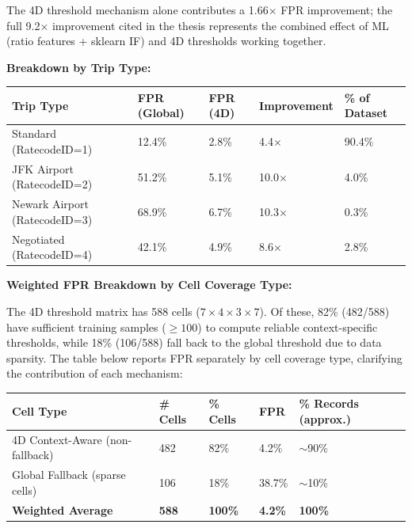 The 4D threshold mechanism alone contributes a 1.66$\times$ FPR improvement; the full 9.2$\times$ improvement cited in the thesis represents the combined effect of ML (ratio features + sklearn IF) and 4D thresholds working together.

\textbf{Breakdown by Trip Type:}

\begin{longtable}{|m{3cm}|m{2.5cm}|m{2.5cm}|m{2.5cm}|m{2.5cm}|}
\hline
\textbf{Trip Type} & \textbf{FPR (Global)} & \textbf{FPR (4D)} & \textbf{Improvement} & \textbf{\% of Dataset} \\ \hline
Standard (RatecodeID=1) & 12.4\% & 2.8\% & 4.4$\times$ & 90.4\% \\ \hline
JFK Airport (RatecodeID=2) & 51.2\% & 5.1\% & 10.0$\times$ & 4.0\% \\ \hline
Newark Airport (RatecodeID=3) & 68.9\% & 6.7\% & 10.3$\times$ & 0.3\% \\ \hline
Negotiated (RatecodeID=4) & 42.1\% & 4.9\% & 8.6$\times$ & 2.8\% \\ \hline
\end{longtable}

\textbf{Weighted FPR Breakdown by Cell Coverage Type:}

The 4D threshold matrix has 588 cells ($7 \times 4 \times 3 \times 7$). Of these, 82\% (482/588) have sufficient training samples ($\geq 100$) to compute reliable context-specific thresholds, while 18\% (106/588) fall back to the global threshold due to data sparsity. The table below reports FPR separately by cell coverage type, clarifying the contribution of each mechanism:

\begin{longtable}{|m{3cm}|m{2cm}|m{2cm}|m{2.5cm}|m{3cm}|}
\hline
\textbf{Cell Type} & \textbf{\# Cells} & \textbf{\% Cells} & \textbf{FPR} & \textbf{\% Records (approx.)} \\ \hline
4D Context-Aware (non-fallback) & 482 & 82\% & 4.2\% & $\sim$90\% \\ \hline
Global Fallback (sparse cells) & 106 & 18\% & 38.7\% & $\sim$10\% \\ \hline
\textbf{Weighted Average} & \textbf{588} & \textbf{100\%} & \textbf{4.2\%} & \textbf{100\%} \\ \hline
\end{longtable}

